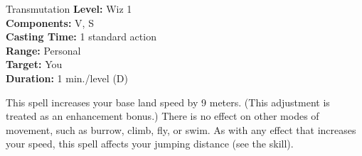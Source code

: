 {Transmutation}
{
	\textbf{Level:}
	Wiz 1\\
	\textbf{Components:}
	V, S\\
	\textbf{Casting Time:}
	1 standard action\\
	\textbf{Range:}
	Personal\\
	\textbf{Target:}
	You\\
	\textbf{Duration:}
	1 min./level (D)\\
}
{
	This spell increases your base land speed by 9 meters. (This adjustment is treated as an enhancement bonus.) There is no effect on other modes of movement, such as burrow, climb, fly, or swim. As with any effect that increases your speed, this spell affects your jumping distance (see the  skill).

}
